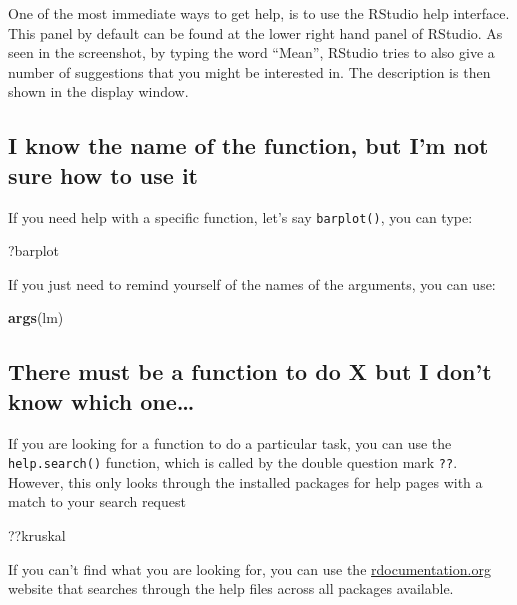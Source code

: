 \documentclass[]{book}
\newenvironment{Shaded}{\begin{snugshade}}{\end{snugshade}}
\newcommand{\KeywordTok}[1]{\textcolor[rgb]{0.13,0.29,0.53}{\textbf{{#1}}}}
\newcommand{\NormalTok}[1]{{#1}}
\theoremstyle{definition}
\theoremstyle{definition}
\theoremstyle{remark}
\begin{document}
One of the most immediate ways to get help, is to use the RStudio help
interface. This panel by default can be found at the lower right hand
panel of RStudio. As seen in the screenshot, by typing the word
``Mean'', RStudio tries to also give a number of suggestions that you
might be interested in. The description is then shown in the display
window.

\subsection{I know the name of the function, but I'm not sure how to use
it}\label{i-know-the-name-of-the-function-but-im-not-sure-how-to-use-it}

If you need help with a specific function, let's say \texttt{barplot()},
you can type:

\begin{Shaded}
\begin{Highlighting}[]
\NormalTok{?barplot}
\end{Highlighting}
\end{Shaded}

If you just need to remind yourself of the names of the arguments, you
can use:

\begin{Shaded}
\begin{Highlighting}[]
\KeywordTok{args}\NormalTok{(lm)}
\end{Highlighting}
\end{Shaded}

\subsection{There must be a function to do X but I don't know which
one\ldots{}}\label{there-must-be-a-function-to-do-x-but-i-dont-know-which-one}

If you are looking for a function to do a particular task, you can use
the \texttt{help.search()} function, which is called by the double
question mark \texttt{??}. However, this only looks through the
installed packages for help pages with a match to your search request

\begin{Shaded}
\begin{Highlighting}[]
\NormalTok{??kruskal}
\end{Highlighting}
\end{Shaded}

If you can't find what you are looking for, you can use the
\href{http://www.rdocumentation.org}{rdocumentation.org} website that
searches through the help files across all packages available.
\end{document}
